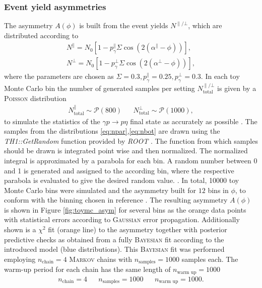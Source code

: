 \subsubsection{Event yield asymmetries}
The asymmetry $A\left(\phi\right)$ is built from the event yields $N^{\parallel/\bot}$, which are distributed according to
\begin{align}
	N^{\parallel}=N_0\left[1-p_\gamma^\parallel\Sigma\cos\left(2\left(\alpha^\parallel-\phi\right)\right)\right],\label{eq:npar}\\
	N^{\bot}=N_0\left[1-p_\gamma^\bot\Sigma\cos\left(2\left(\alpha^\bot-\phi\right)\right)\right],
	\label{eq:nbot}
\end{align}
where the parameters are chosen as $\Sigma=0.3,p_\gamma^\parallel=0.25,p_\gamma^\bot=0.3$. In each toy Monte Carlo bin the number of generated samples per setting $N_\text{total}^{\parallel/\bot}$ is given by a \textsc{Poisson} distribution
\begin{align}
N_\text{total}^\parallel \sim \mathcal{P}(800) && N_\text{total}^\bot \sim \mathcal{P}(1000),
\end{align}
to simulate the statistics of the $\gamma p \to p\eta$ final state as accurately as possible \cite{farahphd}. The samples from the distributions \eqref{eq:npar},\eqref{eq:nbot} are drawn using the \emph{TH1::GetRandom} \cite{rrandom} function provided by \emph{ROOT} \cite{root}. The function from which samples should be drawn is integrated point wise and then normalized. The normalized integral is approximated by a parabola for each bin. A random number between 0 and 1 is generated and assigned to the according bin, where the respective parabola is evaluated to give the desired random value. \cite{rrandom}.
\noindent In total, 10000 toy Monte Carlo bins were simulated and the asymmetry built for $12$ bins in $\phi$, to conform with the binning chosen in reference \cite{farahphd}. The resulting asymmetry $A\left(\phi\right)$ is shown in Figure \ref{fig:toymc_asym} for several bins as the orange data points with statistical errors according to \textsc{Gaussian} error propagation. Additionally shown is a $\chi^2$ fit (orange line) to the asymmetry together with posterior predictive checks as obtained from a fully \textsc{Bayesian} fit according to the introduced model (blue distributions). This \textsc{Bayesian} fit was performed employing $n_\text{chain}=4$ \textsc{Markov} chains with $n_\text{samples}=1000$ samples each. The warm-up period for each chain has the same length of $n_\text{warm up}=1000$
\begin{align}
	n_\text{chain}=4 && n_\text{samples}=1000 && n_\text{warm up}=1000.
\end{align}
